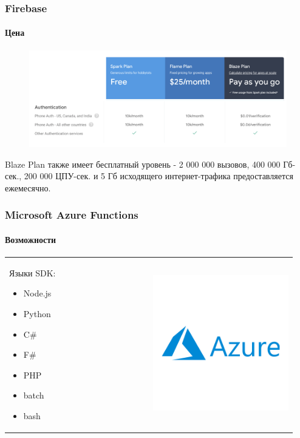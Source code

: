 \documentclass{beamer}
\begin{document}
    \begin{frame}
        \frametitle{Firebase}
        \framesubtitle{Цена}
        \begin{figure}
            \includegraphics[width=\linewidth]{images/FirebasePrice}
        \end{figure}
        Blaze Plan также имеет бесплатный уровень - 2 000 000 вызовов, 400 000 Гб-сек., 200 000 ЦПУ-сек. и 5 Гб исходящего интернет-трафика предоставляется ежемесячно.
    \end{frame}


    \begin{frame}
        \frametitle{Microsoft Azure Functions}
        \framesubtitle{Возможности}
        \begin{tabular}{m{0.47\linewidth}m{0.47\linewidth}}
            Языки SDK:
            \begin{itemize}
                \item Node.js
                \item Python
                \item C\#
                \item F\#
                \item PHP
                \item batch
                \item bash
            \end{itemize}
            &
            \centering
            \includegraphics[width=0.8\linewidth]{images/azurelogo}
 		\end{tabular}
    \end{frame}
\end{document}
